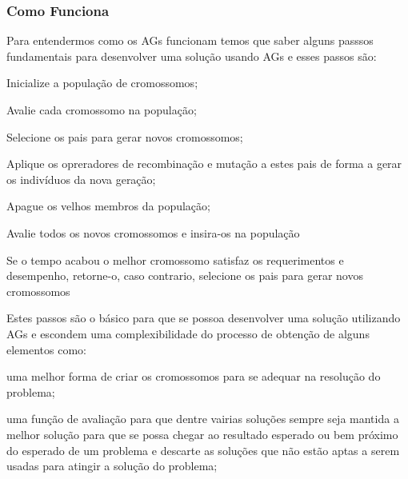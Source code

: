 \subsubsection{Como Funciona}

\par Para entendermos como os AGs funcionam temos que saber alguns passsos
fundamentais para desenvolver uma solução usando AGs e esses passos são:
\item Inicialize a população de cromossomos;
\item Avalie cada cromossomo na população;
\item Selecione os pais para gerar novos cromossomos;
\item Aplique os opreradores de recombinação e mutação a estes pais de forma a
gerar os indivíduos da nova geração;
\item Apague os velhos membros da população;
\item Avalie todos os novos cromossomos e insira-os na população
\item Se o tempo acabou o melhor cromossomo satisfaz os requerimentos e
desempenho, retorne-o, caso contrario, selecione os pais para gerar novos
cromossomos

\par Estes passos são o básico para que se possoa desenvolver uma solução
utilizando AGs e escondem uma complexibilidade do processo de obtenção de alguns
elementos como:
\item uma melhor forma de criar os cromossomos para se adequar na resolução do
problema;
\item uma função de avaliação para que dentre vairias soluções
sempre seja mantida a melhor solução para que se possa chegar ao resultado
esperado ou bem próximo do esperado de um problema e descarte as soluções que
não estão aptas a serem usadas para atingir a solução do problema;
\item 



% 


